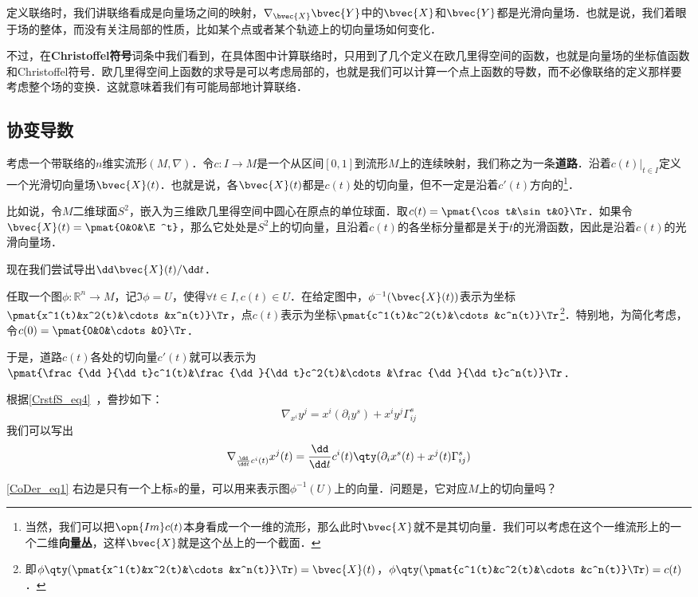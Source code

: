 

定义联络时，我们讲联络看成是向量场之间的映射，$\nabla_\bvec{X}\bvec{Y}$中的$\bvec{X}$和$\bvec{Y}$都是光滑向量场．也就是说，我们着眼于场的整体，而没有关注局部的性质，比如某个点或者某个轨迹上的切向量场如何变化．

不过，在\textbf{Christoffel符号}词条中我们看到，在具体图中计算联络时，只用到了几个定义在欧几里得空间的函数，也就是向量场的坐标值函数和Christoffel符号．欧几里得空间上函数的求导是可以考虑局部的，也就是我们可以计算一个点上函数的导数，而不必像联络的定义那样要考虑整个场的变换．这就意味着我们有可能局部地计算联络．

\subsection{协变导数}

考虑一个带联络的$n$维实流形$(M, \nabla)$．令$c:I\to M$是一个从区间$[0, 1]$到流形$M$上的连续映射，我们称之为一条\textbf{道路}．沿着$c(t)|_{t\in I}$定义一个光滑切向量场$\bvec{X}(t)$．也就是说，各$\bvec{X}(t)$都是$c(t)$处的切向量，但不一定是沿着$c'(t)$方向的\footnote{当然，我们可以把$\opn{Im}c(t)$本身看成一个一维的流形，那么此时$\bvec{X}$就不是其切向量．我们可以考虑在这个一维流形上的一个二维\textbf{向量丛}，这样$\bvec{X}$就是这个丛上的一个截面．}．

比如说，令$M$二维球面$S^2$，嵌入为三维欧几里得空间中圆心在原点的单位球面．取$c(t)=\pmat{\cos t&\sin t&0}\Tr$．如果令$\bvec{X}(t)=\pmat{0&0&\E^t}$，那么它处处是$S^2$上的切向量，且沿着$c(t)$的各坐标分量都是关于$t$的光滑函数，因此是沿着$c(t)$的光滑向量场．

现在我们尝试导出$\dd\bvec{X}(t)/\dd t$．

任取一个图$\phi:\mathbb{R}^n\to M$，记$\Im\phi=U$，使得$\forall t\in I, c(t)\in U$．在给定图中，$\phi^{-1}(\bvec{X}(t))$表示为坐标$\pmat{x^1(t)&x^2(t)&\cdots&x^n(t)}\Tr$，点$c(t)$表示为坐标$\pmat{c^1(t)&c^2(t)&\cdots&c^n(t)}\Tr$\footnote{即$\phi\qty(\pmat{x^1(t)&x^2(t)&\cdots&x^n(t)}\Tr)=\bvec{X}(t)$，$\phi\qty(\pmat{c^1(t)&c^2(t)&\cdots&c^n(t)}\Tr)=c(t)$．}．特别地，为简化考虑，令$c(0)=\pmat{0&0&\cdots&0}\Tr$．

于是，道路$c(t)$各处的切向量$c'(t)$就可以表示为$\pmat{\frac{\dd}{\dd t}c^1(t)&\frac{\dd}{\dd t}c^2(t)&\cdots&\frac{\dd}{\dd t}c^n(t)}\Tr$．

根据\autoref{CrstfS_eq4}~，誊抄如下：
\begin{equation}
\nabla_{x^i}y^j=x^i(\partial_iy^s)+x^iy^j\Gamma^s_{ij}
\end{equation}
我们可以写出
\begin{equation}\label{CoDer_eq1}
\nabla_{\frac{\dd}{\dd t}c^i(t)}x^j(t)=\frac{\dd}{\dd t}c^i(t)\qty(\partial_ix^s(t)+x^j(t)\Gamma^s_{ij})
\end{equation}

\autoref{CoDer_eq1} 右边是只有一个上标$s$的量，可以用来表示图$\phi^{-1}(U)$上的向量．问题是，它对应$M$上的切向量吗？


















